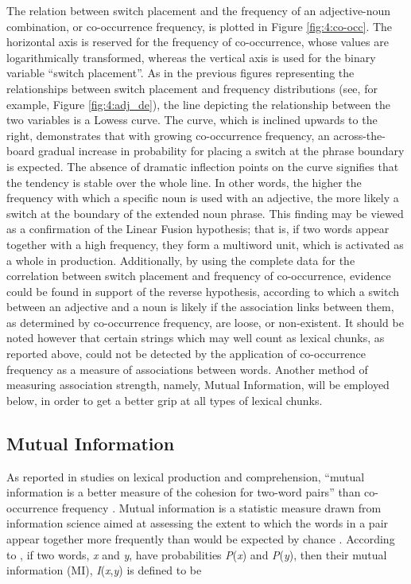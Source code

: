 The relation between switch placement and the frequency of an adjective-noun combination, or co-occurrence frequency, is plotted in Figure \ref{fig:4:co-occ}. The horizontal axis is reserved for the frequency of co-occurrence, whose values are logarithmically transformed, whereas the vertical axis is used for the binary variable “switch placement”. As in the previous figures representing the relationships between switch placement and frequency distributions (see, for example, Figure \ref{fig:4:adj_de}), the line depicting the relationship between the two variables is a Lowess curve. The curve, which is inclined upwards to the right, demonstrates that with growing co-occurrence frequency, an across-the-board gradual increase in probability for placing a switch at the phrase boundary is expected. The absence of dramatic inflection points on the curve signifies that the tendency is stable over the whole line. In other words, the higher the frequency with which a specific noun is used with an adjective, the more likely a switch at the boundary of the extended noun phrase. This finding may be viewed as a confirmation of the Linear Fusion hypothesis; that is, if two words appear together with a high frequency, they form a multiword unit, which is activated as a whole in production. Additionally, by using the complete data for the correlation between switch placement and frequency of co-occurrence, evidence could be found in support of the reverse hypothesis, according to which a switch between an adjective and a noun is likely if the association links between them, as determined by co-occurrence frequency, are loose, or non-existent. It should be noted however that certain strings which may well count as lexical chunks, as reported above, could not be detected by the application of co-occurrence frequency as a measure of associations between words. Another method of measuring association strength, namely, Mutual Information, will be employed below, in order to get a better grip at all types of lexical chunks.

\subsection{Mutual Information}

As reported in studies on lexical production and comprehension, ``mutual information is a better measure of the cohesion for two-word pairs'' \citep{gregory-etal-1999} than co-occurrence frequency \citep[cf.][]{ellis-formulaic-2008}. Mutual information is a statistic measure drawn from information science aimed at assessing the extent to which the words in a pair appear together more frequently than would be expected by chance \citep{oakes-1998, manning-schuetze-1999, wiechmann-2008}. According to \citet{fano-1961}, if two words, \textit{x} and \textit{y}, have probabilities \textit{P}(\textit{x}) and \textit{P}(\textit{y}), then their mutual information (MI), \textit{I}(\textit{x},\textit{y}) is defined to be

